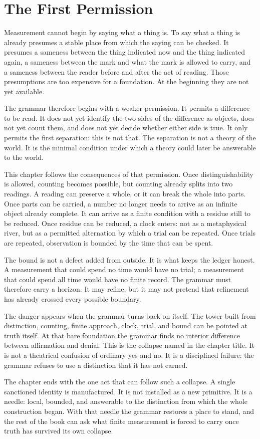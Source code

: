 \section{The First Permission}

Measurement cannot begin by saying what a thing is. To say what a
thing is already presumes a stable place from which the saying can be
checked. It presumes a sameness between the thing indicated now and the
thing indicated again, a sameness between the mark and what the mark is
allowed to carry, and a sameness between the reader before and after the
act of reading. Those presumptions are too expensive for a foundation.
At the beginning they are not yet available.

The grammar therefore begins with a weaker permission. It permits a
difference to be read. It does not yet identify the two sides of the
difference as objects, does not yet count them, and does not yet decide
whether either side is true. It only permits the first separation: this
is not that. The separation is not a theory of the world. It is the
minimal condition under which a theory could later be answerable to the
world.

This chapter follows the consequences of that permission. Once
distinguishability is allowed, counting becomes possible, but counting
already splits into two readings. A reading can preserve a whole, or it
can break the whole into parts. Once parts can be carried, a number no
longer needs to arrive as an infinite object already complete. It can
arrive as a finite condition with a residue still to be reduced. Once
residue can be reduced, a clock enters: not as a metaphysical river, but
as a permitted alternation by which a trial can be repeated. Once trials
are repeated, observation is bounded by the time that can be spent.

The bound is not a defect added from outside. It is what keeps the
ledger honest. A measurement that could spend no time would have no
trial; a measurement that could spend all time would have no finite
record. The grammar must therefore carry a horizon. It may refine, but
it may not pretend that refinement has already crossed every possible
boundary.

The danger appears when the grammar turns back on itself. The tower
built from distinction, counting, finite approach, clock, trial, and
bound can be pointed at truth itself. At that bare foundation the grammar
finds no interior difference between affirmation and denial. This is the
collapse named in the chapter title. It is not a theatrical confusion of
ordinary yes and no. It is a disciplined failure: the grammar refuses to
use a distinction that it has not earned.

The chapter ends with the one act that can follow such a collapse. A
single sanctioned identity is manufactured. It is not installed as a new
primitive. It is a needle: local, bounded, and answerable to the
distinction from which the whole construction began. With that needle
the grammar restores a place to stand, and the rest of the book can ask
what finite measurement is forced to carry once truth has survived its
own collapse.
